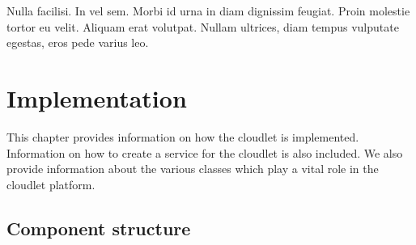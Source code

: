 \begin{savequote}[75mm] 
Nulla facilisi. In vel sem. Morbi id urna in diam dignissim feugiat. Proin molestie tortor eu velit. Aliquam erat volutpat. Nullam ultrices, diam tempus vulputate egestas, eros pede varius leo.
\end{savequote}

\chapter{Implementation}
\label{chapterfive}

This chapter provides information on how the cloudlet is implemented. Information on how to create a service for the cloudlet is also included. We also provide information about the various classes which play a vital role in the cloudlet platform.

\section{Component structure}
\label{sect:structure}

